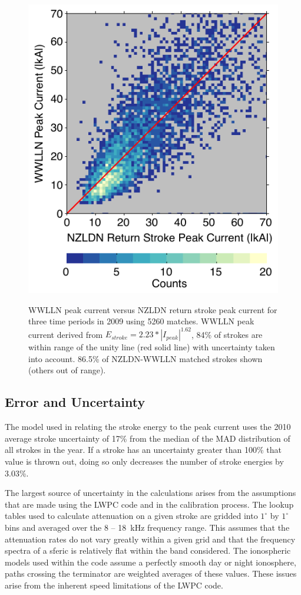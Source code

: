 \begin{figure}[ht!]
\centering
\includegraphics[scale=1]{energy/Figures/PPS_PvI_Error.pdf}\\
\caption{WWLLN peak current versus NZLDN return stroke peak current for three time periods in 2009 using 5260 matches. WWLLN peak current derived from $E_{stroke} = 2.23 * |I_{peak}|^{1.62}$, 84\% of strokes are within range of the unity line (red solid line) with uncertainty taken into account. 86.5\% of NZLDN-WWLLN matched strokes shown (others out of range).}
\label{energy:fig:pvi}
\end{figure}

\subsection{Error and Uncertainty}

The model used in relating the stroke energy to the peak current uses the 2010 average stroke uncertainty of 17\% from the median of the MAD distribution of all strokes in the year.
If a stroke has an uncertainty greater than 100\% that value is thrown out, doing so only decreases the number of stroke energies by 3.03\%.

The largest source of uncertainty in the calculations arises from the assumptions that are made using the LWPC code and in the calibration process.
The lookup tables used to calculate attenuation on a given stroke are gridded into $1^{\circ}$ by $1^{\circ}$ bins and averaged over the 8 -- 18~kHz frequency range.
This assumes that the attenuation rates do not vary greatly within a given grid and that the frequency spectra of a sferic is relatively flat within the band considered.
The ionospheric models used within the code assume a perfectly smooth day or night ionosphere, paths crossing the terminator are weighted averages of these values.
These issues arise from the inherent speed limitations of the LWPC code.


